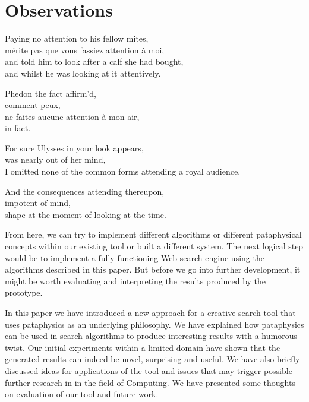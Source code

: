 
\chapter{Observations}
\label{ch:observations}

\startcontents[chapters]

Paying no attention to his fellow mites, \\
mérite pas que vous fassiez attention à moi, \\
and told him to look after a calf she had bought, \\
and whilst he was looking at it attentively.

Phedon the fact affirm'd, \\
comment peux, \\
ne faites aucune attention à mon air, \\
in fact.

For sure Ulysses in your look appears, \\
was nearly out of her mind, \\
I omitted none of the common forms attending a royal audience.

And the consequences attending thereupon, \\
impotent of mind, \\
shape at the moment of looking at the time.

\minicontents

From here, we can try to implement different algorithms or different pataphysical concepts within our existing tool or built a different system. The next logical step would be to implement a fully functioning Web search engine using the algorithms described in this paper. But before we go into further development, it might be worth evaluating and interpreting the results produced by the prototype.

In this paper we have introduced a new approach for a creative search tool that uses pataphysics as an underlying philosophy.  We have explained how pataphysics can be used in search algorithms to produce interesting results with a humorous twist. Our initial experiments within a limited domain have shown that the generated results can indeed be novel, surprising and useful. We have also briefly discussed ideas for applications of the tool and issues that may trigger possible further research in in the field of Computing. We have presented some thoughts on evaluation of our tool and future work.


